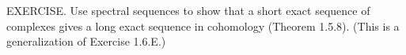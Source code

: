 EXERCISE. Use spectral sequences to show that a short exact sequence of complexes gives a long exact sequence in cohomology (Theorem 1.5.8). (This is a generalization of Exercise 1.6.E.)
